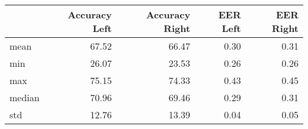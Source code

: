 \begin{tabular}{lrrrr}
\toprule
{} &  Accuracy Left &  Accuracy Right &  EER Left &  EER Right \\
\midrule
mean   &          67.52 &           66.47 &      0.30 &       0.31 \\
min    &          26.07 &           23.53 &      0.26 &       0.26 \\
max    &          75.15 &           74.33 &      0.43 &       0.45 \\
median &          70.96 &           69.46 &      0.29 &       0.31 \\
std    &          12.76 &           13.39 &      0.04 &       0.05 \\
\bottomrule
\end{tabular}
